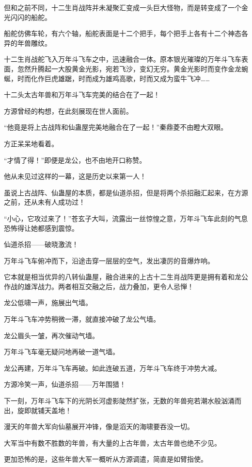 \begin{this_body}
但和之前不同，十二生肖战阵并未凝聚汇变成一头巨大怪物，而是转变成了一个金光闪闪的船舵。

船舵仿佛车轮，有六个轴，船舵表面是十二个把手，每个把手上各有十二个神态各异的年兽雕纹。

十二生肖战舵飞入万年斗飞车之中，迅速融合一体。原本银光璀璨的万年斗飞车表面，忽然升腾起一大股黄金光影，宛若飞沙，变幻无穷。黄金光影时而变作金龙蜿蜒，时而化作巨虎雄踞，时而成为雄鸡高歌，时而又成为蛮牛飞冲……

十二头太古年兽和万年斗飞车完美的结合在了一起！

方源曾经的构想，在此刻展现在世人面前。

“他竟是将上古战阵和仙蛊屋完美地融合在了一起！”秦鼎菱不由瞪大双眼。

方正呆呆地看着。

“才情了得！”即便是龙公，也不由地开口称赞。

他从未见过这样的一幕，这是历史以来第一人！

虽说上古战阵、仙蛊屋的本质，都是仙道杀招，但是将两个杀招融汇起来，在方源之前，还从未有人成功过！

“小心，它攻过来了！”苍玄子大叫，流露出一丝惊惶之意，万年斗飞车此刻的气息恐怖得让她都感到震惊。

仙道杀招——破晓激流！

万年斗飞车俯冲而下，沿途击穿一层层的空气，发出凄厉的音爆炸响。

它本就是相当优异的八转仙蛊屋，融合进来的上古十二生肖战阵更是拥有着和龙公作战的雄浑战力。两者相互交融之后，战力叠加，更令人忌惮！

龙公低啸一声，施展出气墙。

万年斗飞车冲势稍微一滞，就直接冲破了龙公气墙。

龙公眉头一皱，再次催动气墙。

万年斗飞车毫无疑问地再破一道气墙。

龙公再建，万年斗飞车再破。如此连破五道，万年斗飞车终于冲势大减。

方源冷笑一声，仙道杀招——万年围猎！

下一刻，万年斗飞车下的光阴长河虚影陡然扩张，无数的年兽宛若潮水般汹涌而出，旋即就铺天盖地！

漫天的年兽大军向仙墓展开冲锋，像是滔天的海啸要吞没一切。

大军当中有数不胜数的年兽，有大量的上古年兽，太古年兽也绝不少见。

更加恐怖的是，这些年兽大军一概听从方源调遣，简直是如臂指使。


\end{this_body}
